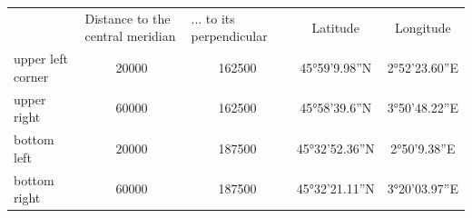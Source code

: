 \documentclass[portrait,a0]{sciposter}
\begin{document}
\begin{minipage}[b]{\textwidth}
\begin{multicols}{3}
\begin{center}
\begin{tabular}{@{}lcccc@{}}
        \midrule
        & \multicolumn{1}{l}{Distance to the central meridian} & \multicolumn{1}{l}{... to its perpendicular} & \multicolumn{1}{c}{Latitude} & \multicolumn{1}{c}{Longitude} \\
        upper left corner & \num{20000}                                          & \num{162500}                                 & 45°59'9.98''N                & 2°52'23.60''E                 \\
        upper right       & \num{60000}                                          & \num{162500}                                 & 45°58'39.6''N                & 3°50'48.22''E                 \\
        bottom left      & \num{20000}                                        & \num{187500}                                & 45°32'52.36''N               & 2°50'9.38''E                  \\
        bottom right     & \num{60000}                                          & \num{187500}                                & 45°32'21.11''N               & 3°20'03.97''E                 \\
        \bottomrule
      \end{tabular}
    \end{center}
    \vfill    
    
    

\end{multicols}
\end{minipage}
\end{document}
